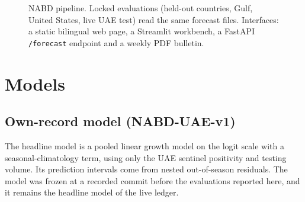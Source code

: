 \documentclass[11pt,a4paper]{article}
\begin{document}
\begin{figure}[h]
\centering
{}
\caption{NABD pipeline. Locked evaluations (held-out countries, Gulf, United States, live UAE test) read the same forecast files. Interfaces: a static bilingual web page, a Streamlit workbench, a FastAPI \texttt{/forecast} endpoint and a weekly PDF bulletin.}
\label{fig:arch}
\end{figure}

\section{Models}

\subsection{Own-record model (NABD-UAE-v1)}
The headline model is a pooled linear growth model on the logit scale with a seasonal-climatology term, using only the UAE sentinel positivity and testing volume. Its prediction intervals come from nested out-of-season residuals. The model was frozen at a recorded commit before the evaluations reported here, and it remains the headline model of the live ledger.
\end{document}
